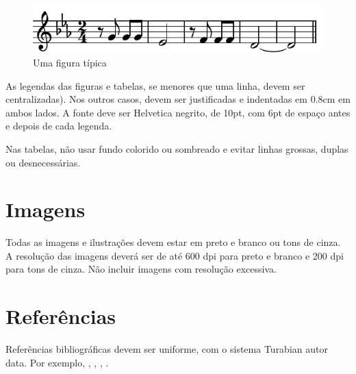 \documentclass[12pt]{article}
\begin{document}
\begin{figure}
\centering
\includegraphics[width=.5\textwidth]{beethoven}
\caption{Uma figura típica}
\label{fig:exampleFig}
\end{figure}

As legendas das figuras e tabelas, se menores que uma linha, devem ser
centralizadas). Nos outros casos, devem ser justificadas e indentadas
em 0.8cm em ambos lados. A fonte deve ser Helvetica negrito, de 10pt,
com 6pt de espaço antes e depois de cada legenda.

Nas tabelas, não usar fundo colorido ou sombreado e evitar linhas
grossas, duplas ou desnecessárias.


\section{Imagens}

Todas as imagens e ilustrações devem estar em preto e branco ou tons
de cinza. A resolução das imagens deverá ser de até 600 dpi para preto
e branco e 200 dpi para tons de cinza. Não incluir imagens com
resolução excessiva.

\section{Referências}

Referências bibliográficas devem ser uniforme, com o sistema Turabian
autor data. Por exemplo, \cite{kroger04:desenvolvendo},
\cite{babbitt61:set}, \cite{coutinho.ea05:computational},
\cite{morris87:composition}.


\end{document}
